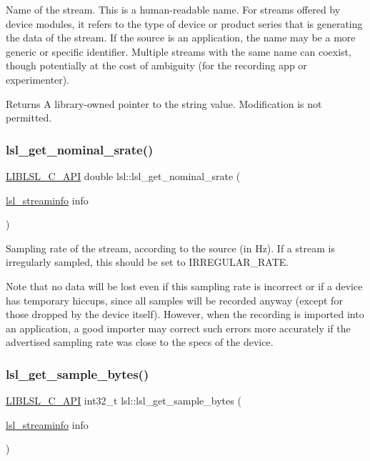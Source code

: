 Name of the stream. This is a human-\/readable name. For streams offered by device modules, it refers to the type of device or product series that is generating the data of the stream. If the source is an application, the name may be a more generic or specific identifier. Multiple streams with the same name can coexist, though potentially at the cost of ambiguity (for the recording app or experimenter). \begin{DoxyReturn}{Returns}
A library-\/owned pointer to the string value. Modification is not permitted. 
\end{DoxyReturn}
\mbox{\label{namespacelsl_a17e4e6d432dc0b7280df4b5365c7da46}} 
\subsubsection{\texorpdfstring{lsl\+\_\+get\+\_\+nominal\+\_\+srate()}{lsl\_get\_nominal\_srate()}}
{\footnotesize\ttfamily \hyperlink{lsl__cpp_8h_aafd0ef1813e8be84a1420c4f1df64615}{L\+I\+B\+L\+S\+L\+\_\+\+C\+\_\+\+A\+PI} double lsl\+::lsl\+\_\+get\+\_\+nominal\+\_\+srate (\begin{DoxyParamCaption}\item[{\hyperlink{namespacelsl_aa0a9ce9956061679949daa2e35aae2e8}{lsl\+\_\+streaminfo}}]{info }\end{DoxyParamCaption})}

Sampling rate of the stream, according to the source (in Hz). If a stream is irregularly sampled, this should be set to I\+R\+R\+E\+G\+U\+L\+A\+R\+\_\+\+R\+A\+TE.

Note that no data will be lost even if this sampling rate is incorrect or if a device has temporary hiccups, since all samples will be recorded anyway (except for those dropped by the device itself). However, when the recording is imported into an application, a good importer may correct such errors more accurately if the advertised sampling rate was close to the specs of the device. \mbox{\label{namespacelsl_a26e8a9f4b8c7ee128362aadbc688dab0}} 
\subsubsection{\texorpdfstring{lsl\+\_\+get\+\_\+sample\+\_\+bytes()}{lsl\_get\_sample\_bytes()}}
{\footnotesize\ttfamily \hyperlink{lsl__cpp_8h_aafd0ef1813e8be84a1420c4f1df64615}{L\+I\+B\+L\+S\+L\+\_\+\+C\+\_\+\+A\+PI} int32\+\_\+t lsl\+::lsl\+\_\+get\+\_\+sample\+\_\+bytes (\begin{DoxyParamCaption}\item[{\hyperlink{namespacelsl_aa0a9ce9956061679949daa2e35aae2e8}{lsl\+\_\+streaminfo}}]{info }\end{DoxyParamCaption})}



